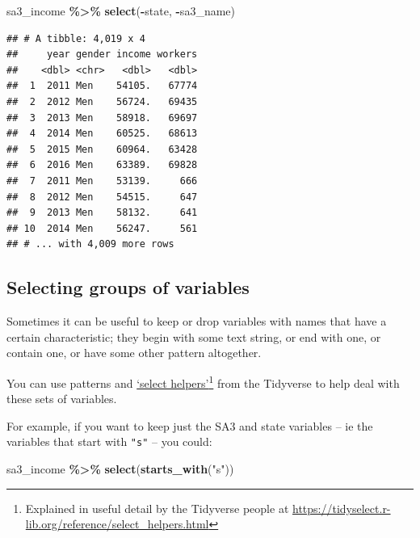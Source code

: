 \documentclass[
]{book}
\newenvironment{Shaded}{\begin{snugshade}}{\end{snugshade}}
\newcommand{\KeywordTok}[1]{\textcolor[rgb]{0.13,0.29,0.53}{\textbf{#1}}}
\newcommand{\NormalTok}[1]{#1}
\newcommand{\OperatorTok}[1]{\textcolor[rgb]{0.81,0.36,0.00}{\textbf{#1}}}
\newcommand{\StringTok}[1]{\textcolor[rgb]{0.31,0.60,0.02}{#1}}
\begin{document}
\begin{Shaded}
\begin{Highlighting}[]
\NormalTok{sa3\_income }\OperatorTok{\%\textgreater{}\%}\StringTok{ }
\StringTok{  }\KeywordTok{select}\NormalTok{(}\OperatorTok{{-}}\NormalTok{state, }\OperatorTok{{-}}\NormalTok{sa3\_name)}
\end{Highlighting}
\end{Shaded}

\begin{verbatim}
## # A tibble: 4,019 x 4
##     year gender income workers
##    <dbl> <chr>   <dbl>   <dbl>
##  1  2011 Men    54105.   67774
##  2  2012 Men    56724.   69435
##  3  2013 Men    58918.   69697
##  4  2014 Men    60525.   68613
##  5  2015 Men    60964.   63428
##  6  2016 Men    63389.   69828
##  7  2011 Men    53139.     666
##  8  2012 Men    54515.     647
##  9  2013 Men    58132.     641
## 10  2014 Men    56247.     561
## # ... with 4,009 more rows
\end{verbatim}

\hypertarget{selecting-groups-of-variables}{%
\subsection{Selecting groups of variables}\label{selecting-groups-of-variables}}

Sometimes it can be useful to keep or drop variables with names that have a certain characteristic; they begin with some text string, or end with one, or contain one, or have some other pattern altogether.

You can use patterns and \href{https://tidyselect.r-lib.org/reference/select_helpers.html}{`select helpers'}\footnote{Explained in useful detail by the Tidyverse people at \url{https://tidyselect.r-lib.org/reference/select_helpers.html}}
from the Tidyverse to help deal with these sets of variables.

For example, if you want to keep just the SA3 and state variables -- ie the variables that start with \texttt{"s"} -- you could:

\begin{Shaded}
\begin{Highlighting}[]
\NormalTok{sa3\_income }\OperatorTok{\%\textgreater{}\%}\StringTok{ }
\StringTok{  }\KeywordTok{select}\NormalTok{(}\KeywordTok{starts\_with}\NormalTok{(}\StringTok{"s"}\NormalTok{))}
\end{Highlighting}
\end{Shaded}
\end{document}
